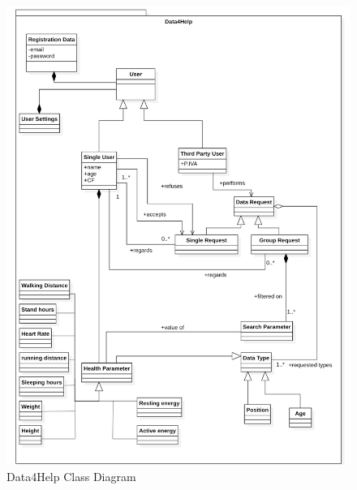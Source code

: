 \documentclass[titlepage]{article}
\begin{document}
		\begin{figure}[H]
			\center
  			\includegraphics[width=\textwidth]{Diagrammi/D4HClass.png}
  			\caption{Data4Help Class Diagram}
 			\label{fig:D4HClass}
		\end{figure}
\end{document}
